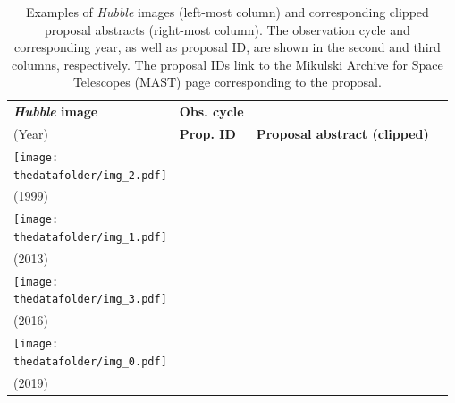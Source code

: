 \documentclass[10pt]{article} %
\newcommand{\hubble}{\emph{Hubble}\xspace}
\newcommand{\datafolder}[1]{\def\thedatafolder{#1}}
\begin{document}

\datafolder{./plots/data/}

\begin{table}[h!]
  \centering
  \begin{tabular}{m{} p{1.9cm} p{1.9cm} m{7.5cm}}
      \toprule
      \centering \bfseries \hubble image & \centering \bfseries Obs. cycle \\ (Year) & \centering \bfseries Prop. ID & \centering \bfseries Proposal abstract (clipped) \tabularnewline
      \midrule
      \centering \texttt{[image: \\thedatafolder/img\_2.pdf]} & \centering  \\ (1999) & \centering  &  {\scriptsize } \tabularnewline
      \midrule
      \centering \texttt{[image: \\thedatafolder/img\_1.pdf]} & \centering  \\ (2013) & \centering  &  {\scriptsize } \tabularnewline
      \midrule
      \centering \texttt{[image: \\thedatafolder/img\_3.pdf]} & \centering  \\ (2016) & \centering  &  {\scriptsize } \tabularnewline
      \midrule
      \centering \texttt{[image: \\thedatafolder/img\_0.pdf]} & \centering  \\ (2019) & \centering  &  {\scriptsize } \tabularnewline
      \bottomrule
  \end{tabular}
  \caption{Examples of \hubble images (left-most column) and corresponding clipped proposal abstracts (right-most column). The observation cycle and corresponding year, as well as proposal ID, are shown in the second and third columns, respectively. The proposal IDs link to the Mikulski Archive for Space Telescopes (MAST) page corresponding to the proposal.}
  \label{tab:dataset}
\end{table}
\end{document}
